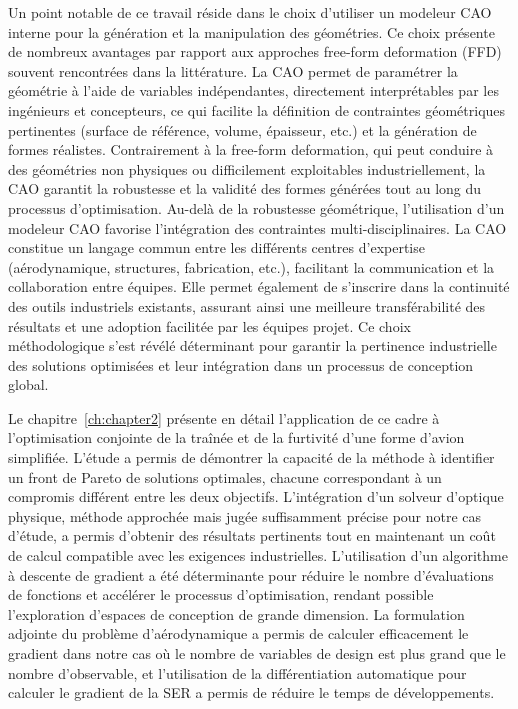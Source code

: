 Un point notable de ce travail réside dans le choix d'utiliser un modeleur CAO interne pour la génération et la manipulation des géométries. Ce choix présente de nombreux avantages par rapport aux approches free-form deformation (FFD) souvent rencontrées dans la littérature. La CAO permet de paramétrer la géométrie à l'aide de variables indépendantes, directement interprétables par les ingénieurs et concepteurs, ce qui facilite la définition de contraintes géométriques pertinentes (surface de référence, volume, épaisseur, etc.) et la génération de formes réalistes. Contrairement à la free-form deformation, qui peut conduire à des géométries non physiques ou difficilement exploitables industriellement, la CAO garantit la robustesse et la validité des formes générées tout au long du processus d'optimisation.
Au-delà de la robustesse géométrique, l'utilisation d'un modeleur CAO favorise l'intégration des contraintes multi-disciplinaires. La CAO constitue un langage commun entre les différents centres d'expertise (aérodynamique, structures, fabrication, etc.), facilitant la communication et la collaboration entre équipes. Elle permet également de s'inscrire dans la continuité des outils industriels existants, assurant ainsi une meilleure transférabilité des résultats et une adoption facilitée par les équipes projet. Ce choix méthodologique s'est révélé déterminant pour garantir la pertinence industrielle des solutions optimisées et leur intégration dans un processus de conception global.

Le chapitre~\ref{ch:chapter2} présente en détail l'application de ce cadre à l'optimisation conjointe de la traînée et de la furtivité d'une forme d'avion simplifiée. L'étude a permis de démontrer la capacité de la méthode à identifier un front de Pareto de solutions optimales, chacune correspondant à un compromis différent entre les deux objectifs. L'intégration d'un solveur d'optique physique, méthode approchée mais jugée suffisamment précise pour notre cas d'étude, a permis d'obtenir des résultats pertinents tout en maintenant un coût de calcul compatible avec les exigences industrielles. L'utilisation d'un algorithme à descente de gradient a été déterminante pour réduire le nombre d'évaluations de fonctions et accélérer le processus d'optimisation, rendant possible l'exploration d'espaces de conception de grande dimension. La formulation adjointe du problème d'aérodynamique a permis de calculer efficacement le gradient dans notre cas où le nombre de variables de design est plus grand que le nombre d'observable, et l'utilisation de la différentiation automatique pour calculer le gradient de la SER a permis de réduire le temps de développements.

